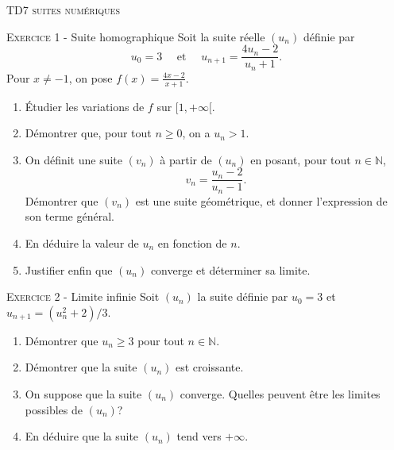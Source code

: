 \documentclass[11pt]{article}
\begin{document}
 

\begin{center}\textsc{{\huge TD7 suites numériques}}\end{center}



\vskip0.3cm\noindent\textsc{Exercice 1} - Suite homographique
\vskip0.2cm
Soit la suite réelle $(u_n)$ définie par 
$$u_0=3\quad\textrm{ et }\quad u_{n+1}=\frac{4u_n-2}{u_n+1}.$$
Pour $x\neq -1$, on pose $f(x)=\frac{4x-2}{x+1}$.
\begin{enumerate}
\item \'Etudier les variations de $f$ sur $[1,+\infty[$.
\item Démontrer que, pour tout $n\geq 0$, on a $u_n > 1$.
\item On définit une suite $(v_n)$ à partir de $(u_n)$ en posant, pour tout $n\in\mathbb N$,
$$v_n=\frac{u_n-2}{u_n-1}.$$
Démontrer que $(v_n)$ est une suite géométrique, et donner l'expression de son terme général.
\item En déduire la valeur de $u_n$ en fonction de $n$. 
\item Justifier enfin que $(u_n)$ converge et déterminer sa limite.
\end{enumerate}




\vskip0.3cm\noindent\textsc{Exercice 2} - Limite infinie
\vskip0.2cm
Soit $(u_n)$ la suite définie par $u_0=3$ et $u_{n+1}=(u_n^2+2)/3$.
\begin{enumerate}
\item Démontrer que $u_n\geq 3$ pour tout $n\in\mathbb N$.
\item Démontrer que la suite $(u_n)$ est croissante.
\item On suppose que la suite $(u_n)$ converge. Quelles peuvent être les limites possibles de $(u_n)$?
\item En déduire que la suite $(u_n)$ tend vers $+\infty$.
\end{enumerate}


\end{document}
